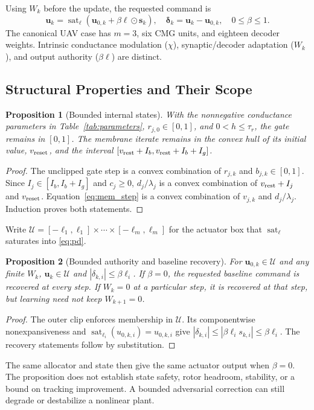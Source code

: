 \documentclass[letterpaper, 10 pt, conference]{ieeeconf}
\newcommand{\sat}{\operatorname{sat}}
\newtheorem{proposition}{Proposition}
\begin{document}
Using $W_k$ before the update, the requested command is
\begin{equation}
 \bm u_k=\sat_{\bm\ell}(\bm u_{0,k}+\beta\bm\ell\odot\bm s_k),\quad
 \bm\delta_k=\bm u_k-\bm u_{0,k},\quad 0\le\beta\le1.
 \label{eq:residual}
\end{equation}
The canonical UAV case has $m=3$, six CMG units, and eighteen decoder
weights. Intrinsic conductance modulation ($\chi$), synaptic/decoder
adaptation ($W_k$), and output authority ($\beta\bm\ell$) are distinct.

\subsection{Structural Properties and Their Scope}
\begin{proposition}[Bounded internal states]
With the nonnegative conductance parameters in Table~\ref{tab:parameters},
$r_{j,0}\in[0,1]$, and $0<h\le\tau_r$, the gate remains in $[0,1]$.
The membrane iterate remains in the convex hull of its initial value,
$v_{\rm reset}$, and the interval
$[v_{\rm rest}+I_b,v_{\rm rest}+I_b+I_g]$.
\end{proposition}
\begin{proof}
The unclipped gate step is a convex combination of $r_{j,k}$ and
$b_{j,k}\in[0,1]$. Since $I_j\in[I_b,I_b+I_g]$ and $c_j\ge0$,
$d_j/\lambda_j$ is a convex combination of $v_{\rm rest}+I_j$ and
$v_{\rm reset}$. Equation~\eqref{eq:mem_step} is a convex combination of
$v_{j,k}$ and $d_j/\lambda_j$. Induction proves both statements.
\end{proof}

Write $\mathcal U=[-\ell_1,\ell_1]\times\cdots\times[-\ell_m,\ell_m]$ for the
actuator box that $\sat_{\bm\ell}$ saturates into \eqref{eq:pd}.

\begin{proposition}[Bounded authority and baseline recovery]
\label{prop:authority}
For $\bm u_{0,k}\in\mathcal U$ and any finite $W_k$,
$\bm u_k\in\mathcal U$ and $|\delta_{k,i}|\le\beta\ell_i$.
If $\beta=0$, the requested baseline command is recovered at every step.
If $W_k=0$ at a particular step, it is recovered at that step, but learning
need not keep $W_{k+1}=0$.
\end{proposition}
\begin{proof}
The outer clip enforces membership in $\mathcal U$. Its componentwise
nonexpansiveness and $\sat_{\ell_i}(u_{0,k,i})=u_{0,k,i}$ give
$|\delta_{k,i}|\le|\beta\ell_i s_{k,i}|\le\beta\ell_i$.
The recovery statements follow by substitution.
\end{proof}
The same allocator and state then give the same actuator output when
$\beta=0$. The proposition does not establish state safety, rotor
headroom, stability, or a bound on tracking improvement. A bounded
adversarial correction can still degrade or destabilize a nonlinear plant.
\end{document}
